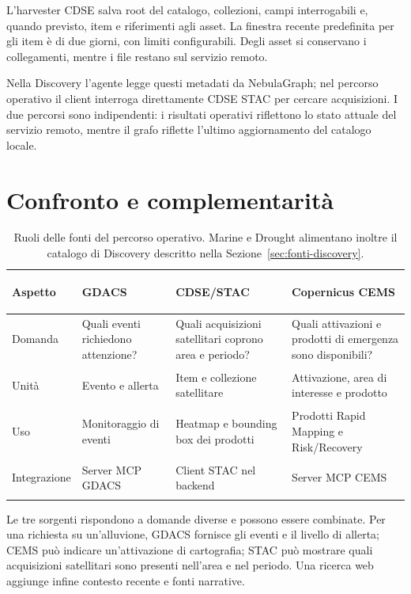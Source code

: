 L'harvester CDSE salva root del catalogo, collezioni, campi interrogabili e,
quando previsto, item e riferimenti agli asset. La finestra recente
predefinita per gli item è di due giorni, con limiti configurabili. Degli asset
si conservano i collegamenti, mentre i file restano sul servizio remoto.

Nella Discovery l'agente legge questi metadati da NebulaGraph; nel percorso
operativo il client interroga direttamente CDSE STAC per cercare acquisizioni.
I due percorsi sono indipendenti: i risultati operativi riflettono lo stato
attuale del servizio remoto, mentre il grafo riflette l'ultimo aggiornamento
del catalogo locale.

\section{Confronto e complementarità}

\begin{table}[htbp]
\centering
\small
\begin{tabularx}{\textwidth}{
    >{\bfseries\raggedright\arraybackslash}p{}
    >{\raggedright\arraybackslash}X
    >{\raggedright\arraybackslash}X
    >{\raggedright\arraybackslash}X}
\toprule
Aspetto &
\bfseries GDACS &
\bfseries CDSE/STAC &
\bfseries Copernicus CEMS \\
\midrule
Domanda &
Quali eventi richiedono attenzione? &
Quali acquisizioni satellitari coprono area e periodo? &
Quali attivazioni e prodotti di emergenza sono disponibili? \\
\addlinespace
Unità &
Evento e allerta &
Item e collezione satellitare &
Attivazione, area di interesse e prodotto \\
\addlinespace
Uso &
Monitoraggio di eventi &
Heatmap e bounding box dei prodotti &
Prodotti Rapid Mapping e Risk/Recovery \\
\addlinespace
Integrazione &
Server MCP GDACS &
Client STAC nel backend &
Server MCP CEMS \\
\bottomrule
\end{tabularx}
\caption{Ruoli delle fonti del percorso operativo. Marine e Drought alimentano
inoltre il catalogo di Discovery descritto nella Sezione~\ref{sec:fonti-discovery}.}
\label{tab:fonti-geospaziali}
\end{table}

Le tre sorgenti rispondono a domande diverse e possono essere combinate. Per
una richiesta su un'alluvione, GDACS fornisce gli eventi e il livello di
allerta; CEMS può indicare un'attivazione di cartografia; STAC può mostrare
quali acquisizioni satellitari sono presenti nell'area e nel periodo. Una
ricerca web aggiunge infine contesto recente e fonti narrative.

